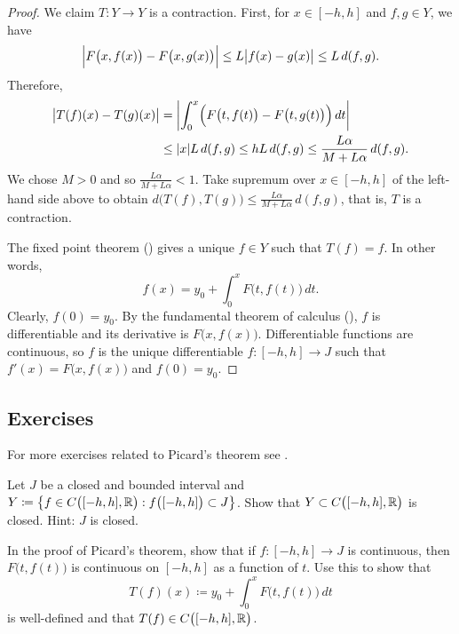 \begin{proof}
We claim $T \colon Y \to Y$ is a contraction.  First, for $x \in [-h,h]$
and $f,g \in Y$, we have
\begin{equation*}
\Bigl\lvert {F\bigl(x,f(x)\bigr) - F\bigl(x,g(x)\bigr)} \Bigr\rvert \leq
L\bigl\lvert {f(x)- g(x)} \bigr\rvert \leq L \, d(f,g) .
\end{equation*}
Therefore,
\begin{equation*}
\begin{split}
\bigl\lvert {T(f)(x) - T(g)(x)} \bigr\rvert
&= \left\lvert {\int_0^x \Bigl( F\bigl(t,f(t)\bigr) - F\bigl(t,g(t)\bigr)\Bigr)\,dt} \right\rvert \\
& \leq \lvert {x} \rvert L \, d(f,g)
 \leq h L\, d(f,g)
 \leq \frac{L\alpha}{M+L\alpha} \, d(f,g) .
\end{split}
\end{equation*}
We chose $M > 0$ and so
$\frac{L\alpha}{M+L\alpha} < 1$.
Take supremum over $x \in [-h,h]$ of the left-hand side above to obtain
$d\bigl(T(f),T(g)\bigr) \leq \frac{L\alpha}{M+L\alpha} \, d(f,g)$,
that is, $T$ is a contraction.

The fixed point theorem ()
gives a unique $f \in Y$ such that $T(f) = f$.
In other words,
\begin{equation*} %
f(x) = y_0 + \int_0^x F\bigl(t,f(t)\bigr)\,dt .
\end{equation*}
Clearly, $f(0) = y_0$.
By the fundamental theorem of calculus (),
$f$ is differentiable and its derivative is
$F\bigl(x,f(x)\bigr)$.
Differentiable functions are continuous, so
$f$ is the unique differentiable $f \colon [-h,h] \to J$
such that
 $f'(x) = F\bigl(x,f(x)\bigr)$ and $f(0) = y_0$.
\end{proof}

\subsection{Exercises}

\begin{exnote}
For more exercises related to Picard's theorem see .
\end{exnote}

\begin{exercise}
Let $J$ be a closed and bounded interval and
$Y \coloneqq \bigl\{ f \in C\bigl([-h,h],{\mathbb{R}}\bigr) : f\bigl([-h,h]\bigr) \subset J \bigr\}$.
Show that $Y \subset C\bigl([-h,h],{\mathbb{R}}\bigr)$ is closed.  Hint: $J$ is closed.
\end{exercise}

\begin{exercise}
In the proof of Picard's theorem,
show that if $f \colon [-h,h] \to J$ is continuous, then $F\bigl(t,f(t)\bigr)$
is continuous on $[-h,h]$ as a function of $t$.  Use this to show that
\begin{equation*}
T(f)(x)
\coloneqq
y_0 + \int_0^x F\bigl(t,f(t)\bigr)\,dt
\end{equation*}
is well-defined and that $T(f) \in C\bigl([-h,h],{\mathbb{R}}\bigr)$.
\end{exercise}


